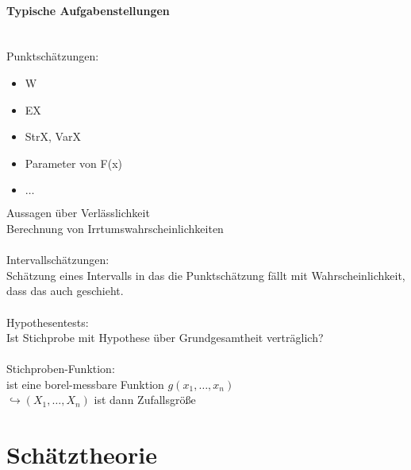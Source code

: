 \documentclass[a4paper,12pt]{scrartcl}
\begin{document}
    \paragraph{Typische Aufgabenstellungen}\quad\\
    Punktschätzungen:
    \begin{itemize}
     \item W
     \item EX
     \item StrX, VarX
     \item Parameter von F(x)
     \item $\dots$
    \end{itemize}
  Aussagen über Verlässlichkeit\\
  Berechnung von Irrtumswahrscheinlichkeiten\\
  \\
  Intervallschätzungen:\\
  Schätzung eines Intervalls in das die Punktschätzung fällt mit Wahrscheinlichkeit, dass das auch geschieht.\\
  \\
  Hypothesentests:\\
  Ist Stichprobe mit Hypothese über Grundgesamtheit verträglich?\\
  \\
  Stichproben-Funktion:\\
  ist eine borel-messbare Funktion $g(x_1,\dots,x_n)$\\
  $\hookrightarrow(X_1,\dots,X_n)$ ist dann Zufallsgröße
  
  \section{Schätztheorie}
\end{document}

